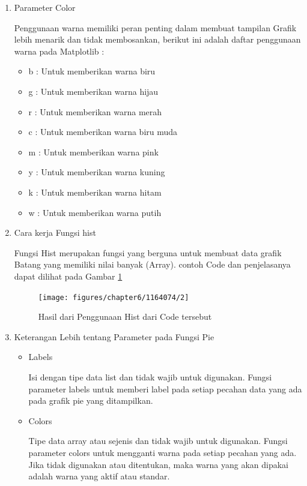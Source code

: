 \begin{enumerate}
\item Parameter Color
\par Penggunaan warna memiliki peran penting dalam membuat tampilan Grafik lebih menarik dan tidak membosankan, berikut ini adalah daftar penggunaan warna pada Matplotlib :

\begin{itemize}
	\item b : Untuk memberikan warna biru
	\item g : Untuk memberikan warna hijau
	\item r : Untuk memberikan warna merah
	\item c : Untuk memberikan warna biru muda
	\item m : Untuk memberikan warna pink
	\item y : Untuk memberikan warna kuning
	\item k : Untuk memberikan warna hitam
	\item w : Untuk memberikan warna putih
\end{itemize}


\item Cara kerja Fungsi hist
\par Fungsi Hist merupakan fungsi yang berguna untuk membuat data grafik Batang yang memiliki nilai banyak (Array). contoh Code dan penjelasanya dapat dilihat pada Gambar \ref{data2}

\begin{figure} [!htbp]
	\centerline{\texttt{[image: figures/chapter6/1164074/2]}}
	\caption{Hasil dari Penggunaan Hist dari Code tersebut}
	\label{data2}
\end{figure}

\item Keterangan Lebih tentang Parameter pada Fungsi Pie
\begin{itemize}
\item Labels
\par Isi dengan tipe data list dan tidak wajib untuk digunakan. Fungsi parameter labels untuk memberi label pada setiap pecahan data yang ada pada grafik pie yang ditampilkan.

\item Colors
\par Tipe data array atau sejenis dan tidak wajib untuk digunakan. Fungsi parameter colors untuk mengganti warna pada setiap pecahan yang ada. Jika tidak digunakan atau ditentukan, maka warna yang akan dipakai adalah warna yang aktif atau standar.
	

\end{itemize}
\end{enumerate}
